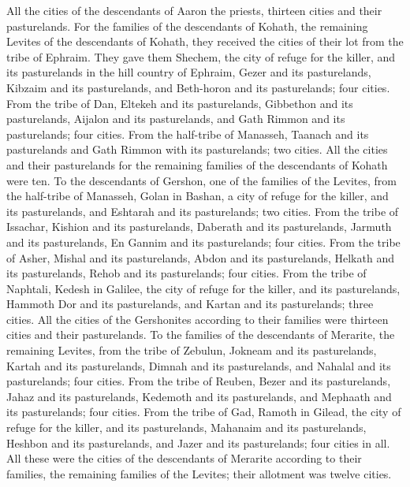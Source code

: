 \begin{biblechapter}
\verse All the cities of the descendants of Aaron the priests, thirteen cities and their pasturelands.
\verse For the families of the descendants of Kohath, the remaining Levites of the descendants of Kohath, they received the cities of their lot from the tribe of Ephraim.
\verse They gave them Shechem, the city of refuge for the killer, and its pasturelands in the hill country of Ephraim, Gezer and its pasturelands,
\verse Kibzaim and its pasturelands, and Beth-horon and its pasturelands; four cities.
\verse From the tribe of Dan, Eltekeh and its pasturelands, Gibbethon and its pasturelands,
\verse Aijalon and its pasturelands, and Gath Rimmon and its pasturelands; four cities.
\verse From the half-tribe of Manasseh, Taanach and its pasturelands and Gath Rimmon with its pasturelands; two cities.
\verse All the cities and their pasturelands for the remaining families of the descendants of Kohath were ten.
\verse To the descendants of Gershon, one of the families of the Levites, from the half-tribe of Manasseh, Golan in Bashan, a city of refuge for the killer, and its pasturelands, and Eshtarah and its pasturelands; two cities.
\verse From the tribe of Issachar, Kishion and its pasturelands, Daberath and its pasturelands,
\verse Jarmuth and its pasturelands, En Gannim and its pasturelands; four cities.
\verse From the tribe of Asher, Mishal and its pasturelands, Abdon and its pasturelands,
\verse Helkath and its pasturelands, Rehob and its pasturelands; four cities.
\verse From the tribe of Naphtali, Kedesh in Galilee, the city of refuge for the killer, and its pasturelands, Hammoth Dor and its pasturelands, and Kartan and its pasturelands; three cities.
\verse All the cities of the Gershonites according to their families were thirteen cities and their pasturelands.
\verse To the families of the descendants of Merarite, the remaining Levites, from the tribe of Zebulun, Jokneam and its pasturelands, Kartah and its pasturelands,
\verse Dimnah and its pasturelands, and Nahalal and its pasturelands; four cities.
\verse From the tribe of Reuben, Bezer and its pasturelands, Jahaz and its pasturelands,
\verse Kedemoth and its pasturelands, and Mephaath and its pasturelands; four cities.
\verse From the tribe of Gad, Ramoth in Gilead, the city of refuge for the killer, and its pasturelands, Mahanaim and its pasturelands,
\verse Heshbon and its pasturelands, and Jazer and its pasturelands; four cities in all.
\verse All these were the cities of the descendants of Merarite according to their families, the remaining families of the Levites; their allotment was twelve cities.

\end{biblechapter}
